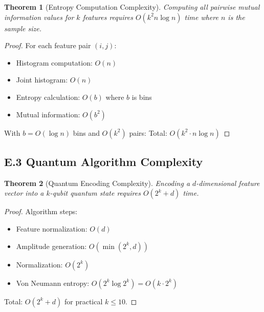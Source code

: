 \documentclass[journal]{IEEEtran}
\newtheorem{theorem}{Theorem}
\begin{document}
\begin{theorem}[Entropy Computation Complexity]
Computing all pairwise mutual information values for $k$ features requires $O(k^2 n \log n)$ time where $n$ is the sample size.
\end{theorem}

\begin{proof}
For each feature pair $(i,j)$:
\begin{itemize}
\item Histogram computation: $O(n)$
\item Joint histogram: $O(n)$
\item Entropy calculation: $O(b)$ where $b$ is bins
\item Mutual information: $O(b^2)$
\end{itemize}

With $b = O(\log n)$ bins and $O(k^2)$ pairs:
Total: $O(k^2 \cdot n \log n)$
\end{proof}

\subsection{E.3 Quantum Algorithm Complexity}

\begin{theorem}[Quantum Encoding Complexity]
Encoding a $d$-dimensional feature vector into a $k$-qubit quantum state requires $O(2^k + d)$ time.
\end{theorem}

\begin{proof}
Algorithm steps:
\begin{itemize}
\item Feature normalization: $O(d)$
\item Amplitude generation: $O(\min(2^k, d))$
\item Normalization: $O(2^k)$
\item Von Neumann entropy: $O(2^k \log 2^k) = O(k \cdot 2^k)$
\end{itemize}

Total: $O(2^k + d)$ for practical $k \leq 10$.
\end{proof}



\end{document}
